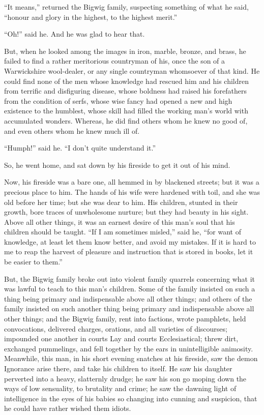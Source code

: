 ``It means,'' returned the Bigwig family, suspecting something of what
he said, ``honour and glory in the highest, to the highest merit.''

``Oh!'' said he.  And he was glad to hear that.

But, when he looked among the images in iron, marble, bronze, and
brass, he failed to find a rather meritorious countryman of his,
once the son of a Warwickshire wool-dealer, or any single countryman
whomsoever of that kind.  He could find none of the men whose
knowledge had rescued him and his children from terrific and
disfiguring disease, whose boldness had raised his forefathers from
the condition of serfs, whose wise fancy had opened a new and high
existence to the humblest, whose skill had filled the working man's
world with accumulated wonders.  Whereas, he did find others whom he
knew no good of, and even others whom he knew much ill of.

``Humph!'' said he.  ``I don't quite understand it.''

So, he went home, and sat down by his fireside to get it out of his
mind.

Now, his fireside was a bare one, all hemmed in by blackened
streets; but it was a precious place to him.  The hands of his wife
were hardened with toil, and she was old before her time; but she
was dear to him.  His children, stunted in their growth, bore traces
of unwholesome nurture; but they had beauty in his sight.  Above all
other things, it was an earnest desire of this man's soul that his
children should be taught.  ``If I am sometimes misled,'' said he,
``for want of knowledge, at least let them know better, and avoid my
mistakes.  If it is hard to me to reap the harvest of pleasure and
instruction that is stored in books, let it be easier to them.''

But, the Bigwig family broke out into violent family quarrels
concerning what it was lawful to teach to this man's children.  Some
of the family insisted on such a thing being primary and
indispensable above all other things; and others of the family
insisted on such another thing being primary and indispensable above
all other things; and the Bigwig family, rent into factions, wrote
pamphlets, held convocations, delivered charges, orations, and all
varieties of discourses; impounded one another in courts Lay and
courts Ecclesiastical; threw dirt, exchanged pummelings, and fell
together by the ears in unintelligible animosity.  Meanwhile, this
man, in his short evening snatches at his fireside, saw the demon
Ignorance arise there, and take his children to itself.  He saw his
daughter perverted into a heavy, slatternly drudge; he saw his son
go moping down the ways of low sensuality, to brutality and crime;
he saw the dawning light of intelligence in the eyes of his babies
so changing into cunning and suspicion, that he could have rather
wished them idiots.

